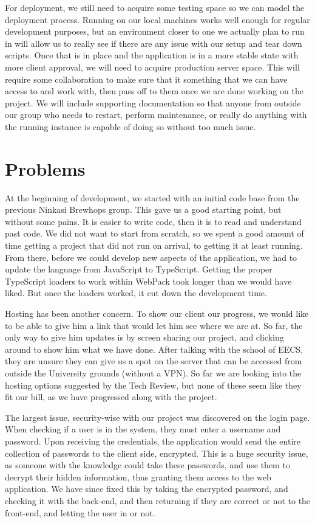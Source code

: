 \documentclass[draftclsnofoot,onecolumn,journal,letterpaper,compsoc,10pt]{IEEEtran}
\begin{document}
For deployment, we still need to acquire some testing space so we can model the deployment process. Running on our local machines works well enough for regular development purposes, but an environment closer to one we actually plan to run in will allow us to really see if there are any issue with our setup and tear down scripts. Once that is in place and the application is in a more stable state with more client approval, we will need to acquire production server space. This will require some collaboration to make sure that it something that we can have access to and work with, then pass off to them once we are done working on the project. We will include supporting documentation so that anyone from outside our group who needs to restart, perform maintenance, or really do anything with the running instance is capable of doing so without too much issue.
 
\section{Problems}

At the beginning of development, we started with an initial code base from the previous Ninkasi Brewhops group. This gave us a good starting point, but without some pains. It is easier to write code, then it is to read and understand past code. We did not want to start from scratch, so we spent a good amount of time getting a project that did not run on arrival, to getting it at least running. From there, before we could develop new aspects of the application, we had to update the language from JavaScript to TypeScript. Getting the proper TypeScript loaders to work within WebPack took longer than we would have liked. But once the loaders worked, it cut down the development time. 

Hosting has been another concern. To show our client our progress, we would like to be able to give him a link that would let him see where we are at. So far, the only way to give him updates is by screen sharing our project, and clicking around to show him what we have done. After talking with the school of EECS, they are unsure they can give us a spot on the server that can be accessed from outside the University grounds (without a VPN). So far we are looking into the hosting options suggested by the Tech Review, but none of these seem like they fit our bill, as we have progressed along with the project. 

The largest issue, security-wise with our project was discovered on the login page. When checking if a user is in the system, they must enter a username and password. Upon receiving the credentials, the application would send the entire collection of passwords to the client side, encrypted. This is a huge security issue, as someone with the knowledge could take these passwords, and use them to decrypt their hidden information, thus granting them access to the web application. We have since fixed this by taking the encrypted password, and checking it with the back-end, and then returning if they are correct or not to the front-end, and letting the user in or not.  
\end{document}

